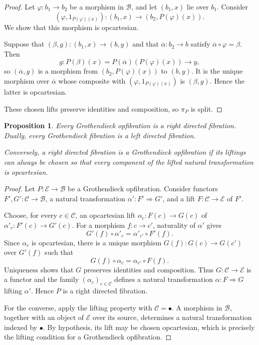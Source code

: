 \documentclass[12pt]{amsart}
\newtheorem{prop}[teo]{Proposition}
\theoremstyle{definition}
\theoremstyle{remark}
\numberwithin{figure}{section}%
\newcommand{\Ba}{\mathcal{B}}
\newcommand{\CC}{\mathcal{C}}
\newcommand{\E}{\mathcal{E}}
\begin{document}
\begin{proof}
Let \(\varphi\colon b_1\to b_2\) be a morphism in \(\Ba\), and let
\((b_1,x)\) lie over \(b_1\). Consider
\[
(\varphi,1_{P(\varphi)(x)})\colon
(b_1,x)\longrightarrow(b_2,P(\varphi)(x)).
\]
We show that this morphism is opcartesian.

Suppose that
\((\beta,g)\colon(b_1,x)\to(b,y)\) and that
\(\overline{\alpha}\colon b_2\to b\) satisfy
\(\overline{\alpha}\circ\varphi=\beta\). Then
\[
g\colon
P(\beta)(x)
=
P(\overline{\alpha})(P(\varphi)(x))
\longrightarrow y,
\]
so \((\overline{\alpha},g)\) is a morphism from
\((b_2,P(\varphi)(x))\) to \((b,y)\). It is the unique morphism over
\(\overline{\alpha}\) whose composite with
\((\varphi,1_{P(\varphi)(x)})\) is \((\beta,g)\). Hence the latter is
opcartesian.

These chosen lifts preserve identities and composition, so
\(\pi_P\) is split.
\end{proof}

\begin{prop}\label{prop:Grothendieck_implies_directed}
Every Grothendieck opfibration is a right directed fibration. Dually, every
Grothendieck fibration is a left directed fibration.

Conversely, a right directed fibration is a Grothendieck opfibration if its
liftings can always be chosen so that every component of the lifted natural
transformation is opcartesian.
\end{prop}

\begin{proof}
Let \(P\colon\E\to\Ba\) be a Grothendieck opfibration. Consider functors
\(F',G'\colon\CC\to\Ba\), a natural transformation
\(\alpha'\colon F'\Rightarrow G'\), and a lift
\(F\colon\CC\to\E\) of \(F'\).

Choose, for every \(c\in\CC\), an opcartesian lift
\(\alpha_c\colon F(c)\to G(c)\) of
\(\alpha'_c\colon F'(c)\to G'(c)\). For a morphism
\(f\colon c\to c'\), naturality of \(\alpha'\) gives
\[
G'(f)\circ\alpha'_c
=
\alpha'_{c'}\circ F'(f).
\]
Since \(\alpha_c\) is opcartesian, there is a unique morphism
\(G(f)\colon G(c)\to G(c')\) over \(G'(f)\) such that
\[
G(f)\circ\alpha_c
=
\alpha_{c'}\circ F(f).
\]
Uniqueness shows that \(G\) preserves identities and composition. Thus
\(G\colon\CC\to\E\) is a functor and the family
\((\alpha_c)_{c\in\CC}\) defines a natural transformation
\(\alpha\colon F\Rightarrow G\) lifting \(\alpha'\). Hence \(P\) is a
right directed fibration.

For the converse, apply the lifting property with
\(\CC=\bullet\). A morphism in \(\Ba\), together with an object of \(\E\)
over its source, determines a natural transformation indexed by
\(\bullet\). By hypothesis, its lift may be chosen opcartesian, which is
precisely the lifting condition for a Grothendieck opfibration.
\end{proof}
\end{document}
